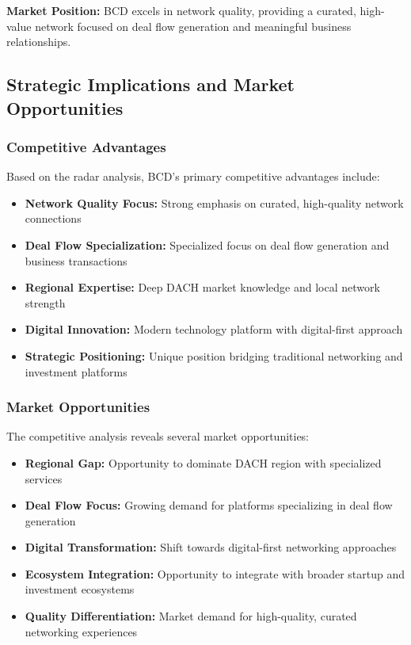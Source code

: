 \textbf{Market Position:} BCD excels in network quality, providing a curated, high-value network focused on deal flow generation and meaningful business relationships.

\subsection{Strategic Implications and Market Opportunities}

\subsubsection{Competitive Advantages}
Based on the radar analysis, BCD's primary competitive advantages include:
\begin{itemize}
    \item \textbf{Network Quality Focus:} Strong emphasis on curated, high-quality network connections
    \item \textbf{Deal Flow Specialization:} Specialized focus on deal flow generation and business transactions
    \item \textbf{Regional Expertise:} Deep DACH market knowledge and local network strength
    \item \textbf{Digital Innovation:} Modern technology platform with digital-first approach
    \item \textbf{Strategic Positioning:} Unique position bridging traditional networking and investment platforms
\end{itemize}

\subsubsection{Market Opportunities}
The competitive analysis reveals several market opportunities:
\begin{itemize}
    \item \textbf{Regional Gap:} Opportunity to dominate DACH region with specialized services
    \item \textbf{Deal Flow Focus:} Growing demand for platforms specializing in deal flow generation
    \item \textbf{Digital Transformation:} Shift towards digital-first networking approaches
    \item \textbf{Ecosystem Integration:} Opportunity to integrate with broader startup and investment ecosystems
    \item \textbf{Quality Differentiation:} Market demand for high-quality, curated networking experiences
\end{itemize}


